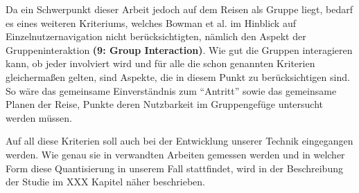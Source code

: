Da ein Schwerpunkt dieser Arbeit jedoch auf dem Reisen als Gruppe liegt, bedarf es eines weiteren Kriteriums, welches Bowman et al. im Hinblick auf Einzelnutzernavigation nicht berücksichtigten, nämlich den Aspekt der Gruppeninteraktion \textbf{(9: Group Interaction)}. Wie gut die Gruppen interagieren kann, ob jeder involviert wird und für alle die schon genannten Kriterien gleichermaßen gelten, sind Aspekte, die in diesem Punkt zu berücksichtigen sind.
So wäre das gemeinsame Einverständnis zum “Antritt” sowie das gemeinsame Planen der Reise, Punkte deren Nutzbarkeit im Gruppengefüge untersucht werden müssen.

Auf all diese Kriterien soll auch bei der Entwicklung unserer Technik eingegangen werden. Wie genau sie in verwandten Arbeiten gemessen werden und in welcher Form diese Quantisierung in unserem Fall stattfindet, wird in der Beschreibung der Studie im XXX Kapitel näher beschrieben.